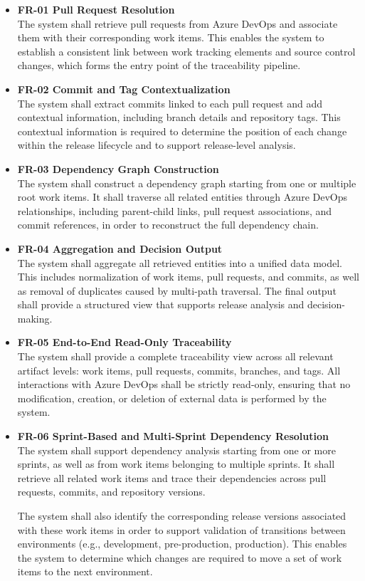\begin{itemize}

\item \textbf{FR-01  Pull Request Resolution} \\
The system shall retrieve pull requests from Azure DevOps and associate them with their corresponding work items.  
This enables the system to establish a consistent link between work tracking elements and source control changes, which forms the entry point of the traceability pipeline.
\item \textbf{FR-02  Commit and Tag Contextualization} \\
The system shall extract commits linked to each pull request and add contextual information, including branch details and repository tags.  
This contextual information is required to determine the position of each change within the release lifecycle and to support release-level analysis.

\item \textbf{FR-03  Dependency Graph Construction} \\
The system shall construct a dependency graph starting from one or multiple root work items.  
It shall traverse all related entities through Azure DevOps relationships, including parent-child links, pull request associations, and commit references, in order to reconstruct the full dependency chain.

\item \textbf{FR-04  Aggregation and Decision Output} \\
The system shall aggregate all retrieved entities into a unified data model.  
This includes normalization of work items, pull requests, and commits, as well as removal of duplicates caused by multi-path traversal.  
The final output shall provide a structured view that supports release analysis and decision-making.

\item \textbf{FR-05  End-to-End Read-Only Traceability} \\
The system shall provide a complete traceability view across all relevant artifact levels: work items, pull requests, commits, branches, and tags.  
All interactions with Azure DevOps shall be strictly read-only, ensuring that no modification, creation, or deletion of external data is performed by the system.
\item \textbf{FR-06  Sprint-Based and Multi-Sprint Dependency Resolution} \\
The system shall support dependency analysis starting from one or more sprints, as well as from work items belonging to multiple sprints.  
It shall retrieve all related work items and trace their dependencies across pull requests, commits, and repository versions.

The system shall also identify the corresponding release versions associated with these work items in order to support validation of transitions between environments (e.g., development, pre-production, production).  
This enables the system to determine which changes are required to move a set of work items to the next environment.
\end{itemize}
